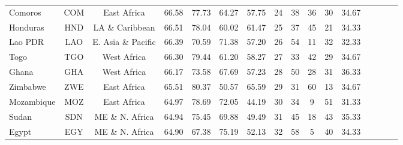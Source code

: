 \begin{singlespace}
{\begin{longtable}[H]{lccccccccccccccc}
Comoros                           & COM           & East Africa        & 66.58       & 77.73            & 64.27                     & 57.75           & 24             & 38                  & 36                           & 30                 & 34.67                  \\
Honduras                          & HND           & LA \& Caribbean    & 66.51       & 78.04            & 60.02                     & 61.47           & 25             & 37                  & 45                           & 21                 & 34.33                  \\
Lao PDR  & LAO           & E. Asia \& Pacific & 66.39       & 70.59            & 71.38                     & 57.20           & 26             & 54                  & 11                           & 32                 & 32.33                  \\
Togo                              & TGO           & West Africa        & 66.30       & 79.44            & 61.20                     & 58.27           & 27             & 33                  & 42                           & 29                 & 34.67                  \\
Ghana                             & GHA           & West Africa        & 66.17       & 73.58            & 67.69                     & 57.23           & 28             & 50                  & 28                           & 31                 & 36.33                  \\
Zimbabwe                          & ZWE           & East Africa        & 65.51       & 80.37            & 50.57                     & 65.59           & 29             & 31                  & 60                           & 13                 & 34.67                  \\
Mozambique                        & MOZ           & East Africa        & 64.97       & 78.69            & 72.05                     & 44.19           & 30             & 34                  & 9                            & 51                 & 31.33                  \\
Sudan                             & SDN           & ME \& N. Africa    & 64.94       & 75.45            & 69.88                     & 49.49           & 31             & 45                  & 18                           & 43                 & 35.33                  \\
Egypt                             & EGY           & ME \& N. Africa    & 64.90       & 67.38            & 75.19                     & 52.13           & 32             & 58                  & 5                            & 40                 & 34.33                  \\

\end{longtable}}
\end{singlespace}
